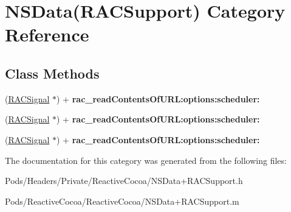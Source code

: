 \hypertarget{category_n_s_data_07_r_a_c_support_08}{}\section{N\+S\+Data(R\+A\+C\+Support) Category Reference}
\label{category_n_s_data_07_r_a_c_support_08}
\subsection*{Class Methods}
\begin{DoxyCompactItemize}
\item 
\mbox{\label{category_n_s_data_07_r_a_c_support_08_aeceac896965b2f2c02f4644c8a2c1505}} 
(\mbox{\hyperlink{interface_r_a_c_signal}{R\+A\+C\+Signal}} $\ast$) + {\bfseries rac\+\_\+read\+Contents\+Of\+U\+R\+L\+:options\+:scheduler\+:}
\item 
\mbox{\label{category_n_s_data_07_r_a_c_support_08_aeceac896965b2f2c02f4644c8a2c1505}} 
(\mbox{\hyperlink{interface_r_a_c_signal}{R\+A\+C\+Signal}} $\ast$) + {\bfseries rac\+\_\+read\+Contents\+Of\+U\+R\+L\+:options\+:scheduler\+:}
\item 
\mbox{\label{category_n_s_data_07_r_a_c_support_08_aeceac896965b2f2c02f4644c8a2c1505}} 
(\mbox{\hyperlink{interface_r_a_c_signal}{R\+A\+C\+Signal}} $\ast$) + {\bfseries rac\+\_\+read\+Contents\+Of\+U\+R\+L\+:options\+:scheduler\+:}
\end{DoxyCompactItemize}


The documentation for this category was generated from the following files\+:\begin{DoxyCompactItemize}
\item 
Pods/\+Headers/\+Private/\+Reactive\+Cocoa/N\+S\+Data+\+R\+A\+C\+Support.\+h\item 
Pods/\+Reactive\+Cocoa/\+Reactive\+Cocoa/N\+S\+Data+\+R\+A\+C\+Support.\+m\end{DoxyCompactItemize}
